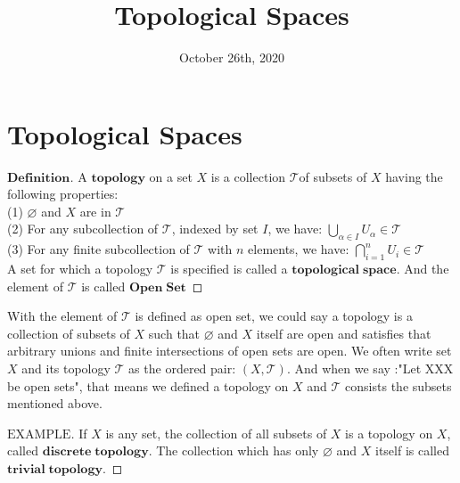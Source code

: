 \documentclass[a4paper, 11pt]{article}
\title{Topological Spaces}
\date{October 26th, 2020}
\theoremstyle{remark}
\newenvironment{mydef}
{\renewcommand\qedsymbol{$ $}\begin{proof}[$\mathbf{Definition}$]}
  {\end{proof}}
\newenvironment{myexam}
{\renewcommand\qedsymbol{$ $}\begin{proof}[$\mathrm{EXAMPLE}$]}
  {\end{proof}}
\theoremstyle{definition}
\begin{document}
\maketitle
\section{Topological Spaces}
\begin{mydef}
        A $\mathbf{topology}$ on a set $X$ is a collection $\mathcal{T}$of subsets of $X$ having the 
        following properties:\\
        \indent(1) $\varnothing$ and $X$ are in $\mathcal{T}$\\
        \indent(2) For any subcollection of $\mathcal{T}$, indexed by set
        $I$, we have: $\displaystyle \bigcup_{\alpha\in I}U_{\alpha} \in 
        \mathcal{T}$\\
        \indent(3) For any finite subcollection of $\mathcal{T}$ with $n$ 
        elements, we have: $\displaystyle \bigcap_{i=1}^{n}U_{i}\in \mathcal{T}$\\
        A set for which a topology $\mathcal{T}$ is specified is called a 
        $\mathbf{topological\;space}$. And the element of $\mathcal{T}$ is called 
        $\mathbf{Open\;Set}$
\end{mydef}
        With the element of $\mathcal{T}$ is defined as open set, we could say a topology
        is a collection of subsets of $X$ such that $\varnothing$ and $X$ itself are open
        and satisfies that arbitrary unions and finite intersections of open sets are 
        open. We often write set $X$ and its topology $\mathcal{T}$ as the ordered pair:
        $(X,\mathcal{T})$. And when we say :"Let XXX be open sets", that means we defined
        a topology on $X$ and $\mathcal{T}$ consists the subsets mentioned above.
 \begin{myexam}
        If $X$ is any set, the collection of all subsets of $X$ is a topology on $X$, 
        called $\mathbf{discrete\;topology}$. The collection which has only $\varnothing$
        and $X$ itself is called $\mathbf{trivial\;topology}$.
 \end{myexam}
 
\end{document}
